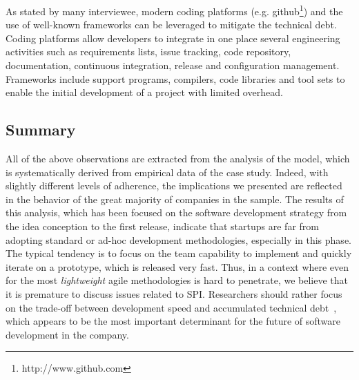 \documentclass[10pt,journal,letterpaper,compsoc]{IEEEtran}
\begin{document}
As stated by many interviewee, modern coding platforms (e.g. github\footnote{http://www.github.com}) and the use of well-known frameworks can be leveraged to mitigate the technical debt. Coding platforms allow developers to integrate in one place several engineering activities such as requirements lists, issue tracking, code repository, documentation, continuous integration, release and configuration management. Frameworks include support programs, compilers, code libraries and tool sets to enable the initial development of a project with limited overhead.




\subsection{Summary} All of the above observations are extracted from the
analysis of the model, which is systematically derived from empirical data of
the case study. Indeed, with slightly different levels of adherence, the
implications we presented are reflected in the behavior of the great majority
of companies in the sample. The results of this analysis, which has been
focused on the software development strategy from the idea conception to the
first release, indicate that startups are far from adopting standard or ad-hoc
development methodologies, especially in this phase. The typical tendency is to
focus on the team capability to implement and quickly iterate on a prototype,
which is released very fast. Thus, in a context where even for the most
\textit{lightweight} agile methodologies is hard to penetrate, we believe that
it is premature to discuss issues related to SPI. Researchers should rather
focus on the trade-off between development speed and accumulated technical 
debt~\cite{Brown:2010:MTD:1882362.1882373}, which appears to be the most 
important determinant for the future of software development in the company.
\end{document}
